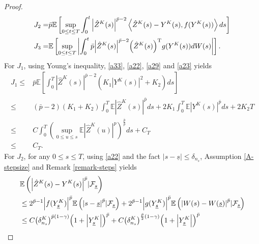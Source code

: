 \documentclass[preprint,12pt,compress]{elsarticle}
\begin{document}
\begin{proof}
\begin{equation*}
\begin{split}
		{J_2} =& \bar p\mathbb{E}\left[ {\mathop {\sup }\limits_{0 \le t \le T} \int_0^{{t}} {{{\left| {{{\hat Z}^K}(s)} \right|}^{\bar p - 2}}\left\langle {{{\hat Z}^K}(s) - {Y^K}(s),f({Y^K}(s))} \right\rangle ds} } \right] \\
		{J_3} =& \mathbb{E}\left[ {\mathop {\sup }\limits_{0 \le t \le T} \left| {\int_0^t {\bar p{{\left| {{{\hat Z}^K}(s)} \right|}^{\bar p - 2}}{{\left( {{{\hat Z}^K}(s)} \right)}^{\rm T}}g({Y^K}(s))dW(s)} } \right|} \right] .
	\end{split}
\end{equation*}
For $J_1$, using Young's inequality, \eqref{a33}, \eqref{a22}, \eqref{a29} and \eqref{a23} yields
\begin{equation}  \label{J1}
\begin{split} 
	J_1
	\le& \bar p\mathbb{E}\left[ {\int_0^T {{{\left| {{{\hat Z}^K}(s)} \right|}^{\bar p - 2}}\left( {{K_1}{{\left| {{Y^K}(s)} \right|}^2} + {K_2}} \right)ds} } \right] \\
	\le& (\bar p - 2)({K_1} + {K_2})\int_0^T {\mathbb{E}{{\left| {{{\hat Z}^K}(s)} \right|}^{\bar p}}ds}  + 2{K_1}\int_0^T {\mathbb{E}{{\left| {{Y^K}(s)} \right|}^{\bar p}}ds}  + 2{K_2}T \\
	\le& C\int_0^T {{{\left( {\mathop {\sup }\limits_{0 \le u \le s} \mathbb{E}{{\left| {{{\hat Z}^K}(u)} \right|}^p}} \right)}^{\frac{{\bar p}}{p}}}ds} + C_T \\
	\le& {C_T}.
\end{split}
\end{equation}
For $J_2$, for any $0 \le s \le T$, using \eqref{a22} and the fact $|s - \underline{s}| \le \delta_{n_s}$, Assumption \ref{A-stepsize} and Remark \ref{remark-steps} yields
\begin{equation}  \label{a16}
\begin{split}
	&\mathbb{E}\left( {{{\left| {{{\hat Z}^K}(s) - {Y^K}(s)} \right|}^{\bar p}}|{{\cal F}_{{\underline{s}}}}} \right)  \\
	&\le {2^{{\bar p} - 1}}{\left| {f(Y_{{\underline{s}}}^K)} \right|^{\bar p}}\mathbb{E}\left( {{{\left| {s - {\underline{s}}} \right|}^{\bar p}}|{\mathcal{F}_{{\underline{s}}}}} \right) + {2^{{\bar p} - 1}}{\left| {g(Y_{{\underline{s}}}^K)} \right|^{\bar p}}\mathbb{E}\left( {{{\left| {W(s) - W({\underline{s}})} \right|}^{\bar p}}|{\mathcal{F}_{{\underline{s}}}}} \right) \\
	&\le C{\left( {\delta _{{n_s}}^{K}} \right)^{\bar p(1 - \gamma )}}{\left( {1 + \left| {Y_{{\underline{s}}}^K} \right|} \right)^{\bar p}} + C{\left( {\delta _{{n_s}}^{K}} \right)^{\frac{{\bar p}}{2}(1 - \gamma )}}{\left( {1 + \left| {Y_{{\underline{s}}}^K} \right|} \right)^{\bar p}} \\

\end{split}
\end{equation}
\end{proof}
\end{document}
